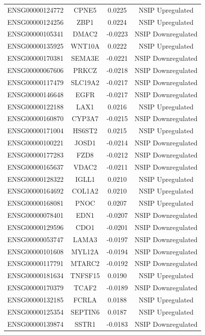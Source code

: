 \documentclass[
]{article}
\begin{document}
\begin{singlespace}
\begin{longtable}[t]{lccc}
ENSG00000124772 & CPNE5 & 0.0225 & NSIP Upregulated\\
\addlinespace
ENSG00000124256 & ZBP1 & 0.0224 & NSIP Upregulated\\
ENSG00000105341 & DMAC2 & -0.0223 & NSIP Downregulated\\
ENSG00000135925 & WNT10A & 0.0222 & NSIP Upregulated\\
ENSG00000170381 & SEMA3E & -0.0221 & NSIP Downregulated\\
ENSG00000067606 & PRKCZ & -0.0218 & NSIP Downregulated\\
\addlinespace
ENSG00000117479 & SLC19A2 & -0.0217 & NSIP Downregulated\\
ENSG00000146648 & EGFR & -0.0217 & NSIP Downregulated\\
ENSG00000122188 & LAX1 & 0.0216 & NSIP Upregulated\\
ENSG00000160870 & CYP3A7 & -0.0215 & NSIP Downregulated\\
ENSG00000171004 & HS6ST2 & 0.0215 & NSIP Upregulated\\
\addlinespace
ENSG00000100221 & JOSD1 & -0.0214 & NSIP Downregulated\\
ENSG00000177283 & FZD8 & -0.0212 & NSIP Downregulated\\
ENSG00000165637 & VDAC2 & -0.0211 & NSIP Downregulated\\
ENSG00000128322 & IGLL1 & 0.0210 & NSIP Upregulated\\
ENSG00000164692 & COL1A2 & 0.0210 & NSIP Upregulated\\
\addlinespace
ENSG00000168081 & PNOC & 0.0207 & NSIP Upregulated\\
ENSG00000078401 & EDN1 & -0.0207 & NSIP Downregulated\\
ENSG00000129596 & CDO1 & -0.0201 & NSIP Downregulated\\
ENSG00000053747 & LAMA3 & -0.0197 & NSIP Downregulated\\
ENSG00000101608 & MYL12A & -0.0194 & NSIP Downregulated\\
\addlinespace
ENSG00000117791 & MTARC2 & -0.0192 & NSIP Downregulated\\
ENSG00000181634 & TNFSF15 & 0.0190 & NSIP Upregulated\\
ENSG00000170379 & TCAF2 & -0.0189 & NSIP Downregulated\\
ENSG00000132185 & FCRLA & 0.0188 & NSIP Upregulated\\
ENSG00000125354 & SEPTIN6 & 0.0187 & NSIP Upregulated\\
\addlinespace
ENSG00000139874 & SSTR1 & -0.0183 & NSIP Downregulated\\

\end{longtable}
\end{singlespace}
\end{document}
